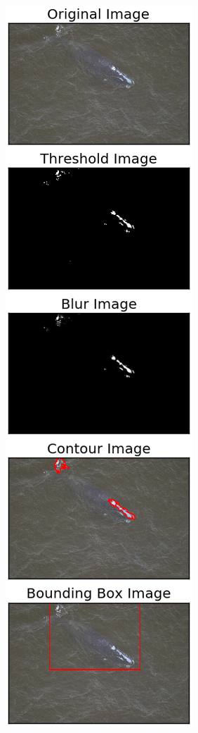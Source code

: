 \begin{figure}[H]
\begin{subfigure}[b]{0.25\linewidth}
		\caption{}
	\end{subfigure}
	\begin{subfigure}[b]{0.25\linewidth}
		\includegraphics[width=\linewidth]{sections/imgs/preprocessing/figure_2.png}

\end{subfigure}
\end{figure}
